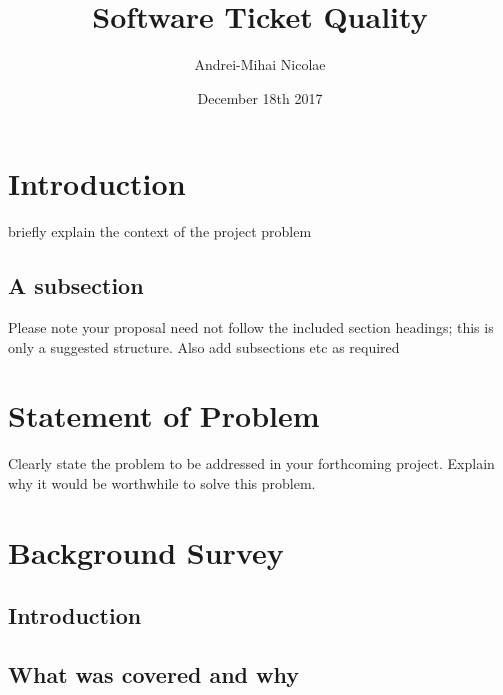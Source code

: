 \documentclass{mprop}
\begin{document}
\title{Software Ticket Quality}
\author{Andrei-Mihai Nicolae}
\date{December 18th 2017}
\maketitle

\tableofcontents
\newpage

\section{Introduction}\label{intro}

briefly explain the context of the project problem

\subsection{A subsection}
Please note your proposal need not follow the included section headings; this is only a suggested structure. Also add subsections etc as required

\section{Statement of Problem}

Clearly state the problem to be addressed in your forthcoming project.
Explain why it would be worthwhile to solve this problem.

\section{Background Survey}

\subsection{Introduction}

\subsection{What was covered and why}
\end{document}
